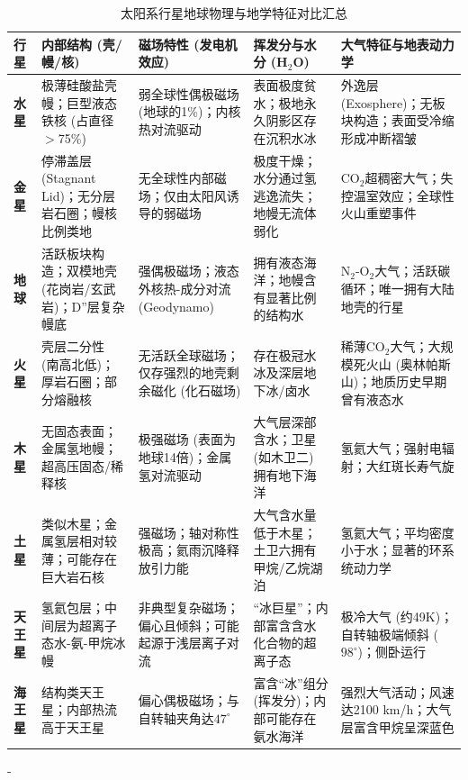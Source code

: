 \documentclass[12pt,a4paper]{article}
\begin{document}
	\begin{table}[htbp]
		\centering
		\caption{太阳系行星地球物理与地学特征对比汇总}
		\label{tab:geophysics_planets}
		\footnotesize
		\begin{tabularx}{\linewidth}{l X X X X}
			\toprule
			行星 & 内部结构 (壳/幔/核) & 磁场特性 (发电机效应) & 挥发分与水分 (H$_2$O) & 大气特征与地表动力学 \\
			\midrule
			\textbf{水星} & 极薄硅酸盐壳幔；巨型液态铁核 (占直径$>$75\%) & 弱全球性偶极磁场 (地球的1\%)；内核热对流驱动 & 表面极度贫水；极地永久阴影区存在沉积水冰 & 外逸层 (Exosphere)；无板块构造；表面受冷缩形成冲断褶皱 \\
			\addlinespace
			\textbf{金星} & 停滞盖层 (Stagnant Lid)；无分层岩石圈；幔核比例类地 & 无全球性内部磁场；仅由太阳风诱导的弱磁场 & 极度干燥；水分通过氢逃逸流失；地幔无流体弱化 & CO$_2$超稠密大气；失控温室效应；全球性火山重塑事件 \\
			\addlinespace
			\textbf{地球} & 活跃板块构造；双模地壳 (花岗岩/玄武岩)；D''层复杂幔底 & 强偶极磁场；液态外核热-成分对流 (Geodynamo) & 拥有液态海洋；地幔含有显著比例的结构水 & N$_2$-O$_2$大气；活跃碳循环；唯一拥有大陆地壳的行星 \\
			\addlinespace
			\textbf{火星} & 壳层二分性 (南高北低)；厚岩石圈；部分熔融核 & 无活跃全球磁场；仅存强烈的地壳剩余磁化 (化石磁场) & 存在极冠水冰及深层地下冰/卤水 & 稀薄CO$_2$大气；大规模死火山 (奥林帕斯山)；地质历史早期曾有液态水 \\
			\addlinespace
			\textbf{木星} & 无固态表面；金属氢地幔；超高压固态/稀释核 & 极强磁场 (表面为地球14倍)；金属氢对流驱动 & 大气层深部含水；卫星 (如木卫二) 拥有地下海洋 & 氢氦大气；强射电辐射；大红斑长寿气旋 \\
			\addlinespace
			\textbf{土星} & 类似木星；金属氢层相对较薄；可能存在巨大岩石核 & 强磁场；轴对称性极高；氦雨沉降释放引力能 & 大气含水量低于木星；土卫六拥有甲烷/乙烷湖泊 & 氢氦大气；平均密度小于水；显著的环系统动力学 \\
			\addlinespace
			\textbf{天王星} & 氢氦包层；中间层为超离子态水-氨-甲烷冰幔 & 非典型复杂磁场；偏心且倾斜；可能起源于浅层离子对流 & “冰巨星”；内部富含含水化合物的超离子态 & 极冷大气 (约49K)；自转轴极端倾斜 ($98^\circ$)；侧卧运行 \\
			\addlinespace
			\textbf{海王星} & 结构类天王星；内部热流高于天王星 & 偏心偶极磁场；与自转轴夹角达$47^\circ$ & 富含“冰”组分 (挥发分)；内部可能存在氨水海洋 & 强烈大气活动；风速达2100 km/h；大气层富含甲烷呈深蓝色 \\
			\bottomrule
		\end{tabularx}
	\end{table}
	-
	
\end{document}
